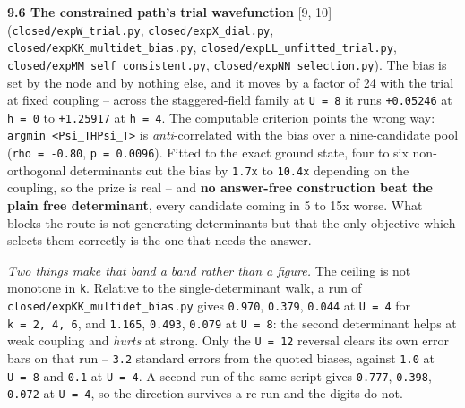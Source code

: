 \documentclass[10pt,letterpaper,twocolumn]{article}
\begin{document}
\textbf{9.6 The constrained path's trial wavefunction} {[}9, 10{]} (\texttt{closed/\allowbreak{}expW\_\allowbreak{}trial.\allowbreak{}py},
\texttt{closed/\allowbreak{}expX\_\allowbreak{}dial.\allowbreak{}py}, \texttt{closed/\allowbreak{}expKK\_\allowbreak{}multidet\_\allowbreak{}bias.\allowbreak{}py}, \texttt{closed/\allowbreak{}expLL\_\allowbreak{}unfitted\_\allowbreak{}trial.\allowbreak{}py},
\texttt{closed/\allowbreak{}expMM\_\allowbreak{}self\_\allowbreak{}consistent.\allowbreak{}py}, \texttt{closed/\allowbreak{}expNN\_\allowbreak{}selection.\allowbreak{}py}). The bias is set by the node and by
nothing else, and it moves by a factor of 24 with the trial at fixed coupling -- across the
staggered-field family at \texttt{U\ =\allowbreak{}\ 8} it runs \texttt{+\allowbreak{}0.\allowbreak{}05246} at \texttt{h\ =\allowbreak{}\ 0} to \texttt{+\allowbreak{}1.\allowbreak{}25917} at \texttt{h\ =\allowbreak{}\ 4}. The
computable criterion points the wrong way: \texttt{argmin\ \textless{}\allowbreak{}Psi\_\allowbreak{}T\textbar{}\allowbreak{}H\textbar{}\allowbreak{}Psi\_\allowbreak{}T\textgreater{}\allowbreak{}} is \emph{anti}-correlated with the
bias over a nine-candidate pool (\texttt{rho\ =\allowbreak{}\ -{}\allowbreak{}0.\allowbreak{}80}, \texttt{p\ =\allowbreak{}\ 0.\allowbreak{}0096}). Fitted to the exact ground state,
four to six non-orthogonal determinants cut the bias by \texttt{1.\allowbreak{}7x} to \texttt{10.\allowbreak{}4x} depending on the
coupling, so the prize is real -- and \textbf{no answer-free construction beat the plain free
determinant}, every candidate coming in 5 to 15x worse. What blocks the route is not generating
determinants but that the only objective which selects them correctly is the one that needs the
answer.

\emph{Two things make that band a band rather than a figure.} The ceiling is not monotone in \texttt{k}.
Relative to the single-determinant walk, a run of \texttt{closed/\allowbreak{}expKK\_\allowbreak{}multidet\_\allowbreak{}bias.\allowbreak{}py} gives \texttt{0.\allowbreak{}970},
\texttt{0.\allowbreak{}379}, \texttt{0.\allowbreak{}044} at \texttt{U\ =\allowbreak{}\ 4} for \texttt{k\ =\allowbreak{}\ 2,\allowbreak{}\ 4,\allowbreak{}\ 6}, and \texttt{1.\allowbreak{}165}, \texttt{0.\allowbreak{}493}, \texttt{0.\allowbreak{}079} at \texttt{U\ =\allowbreak{}\ 8}: the second
determinant helps at weak coupling and \emph{hurts} at strong. Only the \texttt{U\ =\allowbreak{}\ 12} reversal clears its own
error bars on that run -- \texttt{3.\allowbreak{}2} standard errors from the quoted biases, against \texttt{1.\allowbreak{}0} at \texttt{U\ =\allowbreak{}\ 8}
and \texttt{0.\allowbreak{}1} at \texttt{U\ =\allowbreak{}\ 4}. A second run of the same script gives \texttt{0.\allowbreak{}777}, \texttt{0.\allowbreak{}398}, \texttt{0.\allowbreak{}072} at \texttt{U\ =\allowbreak{}\ 4},
so the direction survives a re-run and the digits do not.
\end{document}
